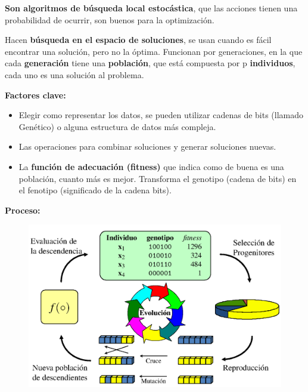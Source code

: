 \documentclass[12pt]{report} %
\begin{document}
\textbf{Son algoritmos de búsqueda local estocástica}, que las acciones tienen una probabilidad de ocurrir, son buenos para la optimización.

Hacen \textbf{búsqueda en el espacio de soluciones}, se usan cuando es fácil encontrar una solución, pero no la óptima. Funcionan por generaciones, en la que cada \textbf{generación} tiene una \textbf{población}, que está compuesta por p \textbf{individuos}, cada uno es una solución al problema.

\textbf{Factores clave:}
\begin{itemize}
  \item Elegir como representar los datos, se pueden utilizar cadenas de bits (llamado Genético) o alguna estructura de datos más compleja.
  \item Las operaciones para combinar soluciones y generar soluciones nuevas.
  \item La \textbf{función de adecuación (fitness)} que indica como de buena es una población, cuanto más es mejor. Transforma el genotipo (cadena de bits) en el fenotipo (significado de la cadena bits).
\end{itemize}
\pagebreak
\textbf{Proceso:}
\begin{figure}[H]
	{\includegraphics[scale=.3]{2021-03-19 11_42_34-otras-tecnicas.pdf - Foxit Reader.png}}
\end{figure}
\end{document}
